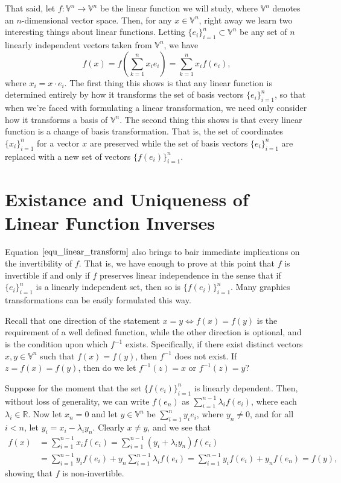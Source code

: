\documentclass[12pt]{article}
\newcommand{\V}{\mathbb{V}}
\newcommand{\R}{\mathbb{R}}
\begin{document}
That said, let $f:\V^n\to\V^n$ be the linear function we will study, where $\V^n$
denotes an $n$-dimensional vector space.  Then, for any $x\in\V^n$, right
away we learn two interesting things about linear functions.  Letting $\{e_i\}_{i=1}^n\subset\V^n$
be any set of $n$ linearly independent vectors taken from $\V^n$, we have
\begin{equation}\label{equ_linear_transform}
f(x) = f\left(\sum_{k=1}^n x_i e_i\right) = \sum_{k=1}^n x_i f(e_i),
\end{equation}
where $x_i = x\cdot e_i$.  The first thing this shows is that any linear function
is determined entirely by how it transforms the set of basis vectors $\{e_i\}_{i=1}^n$,
so that when we're faced with formulating a linear transformation, we need only
consider how it transforms a basis of $\V^n$.  The second thing this shows is
that every linear function is a change of basis transformation.  That is, the
set of coordinates $\{x_i\}_{i=1}^n$ for a vector $x$ are preserved while
the set of basis vectors $\{e_i\}_{i=1}^n$ are replaced with a new set
of vectors $\{f(e_i)\}_{i=1}^n$.

\section{Existance and Uniqueness of Linear Function Inverses}

Equation $\eqref{equ_linear_transform}$ also brings to bair immediate
implications on the invertibility of $f$.  That is, we have enough to
prove at this point that $f$ is invertible if and only if $f$ preserves
linear independence in the sense that if $\{e_i\}_{i=1}^n$ is a
linearly independent set, then so is $\{f(e_i)\}_{i=1}^n$.  Many graphics
transformations can be easily formulated this way.

Recall that one direction of the statement $x=y\iff f(x)=f(y)$ is the
requirement of a well defined function, while the other direction is optional,
and is the condition upon which $f^{-1}$ exists.  Specifically, if there
exist distinct vectors $x,y\in\V^n$ such that $f(x)=f(y)$, then
$f^{-1}$ does not exist.  If $z=f(x)=f(y)$, then do we let $f^{-1}(z)=x$
or $f^{-1}(z)=y$?

Suppose for the moment that the set $\{f(e_i)\}_{i=1}^n$ is linearly dependent.
Then, without loss of generality, we can write $f(e_n)$
as $\sum_{i=1}^{n-1}\lambda_i f(e_i)$, where each $\lambda_i\in\R$.
Now let $x_n=0$ and let $y\in\V^n$ be $\sum_{i=1}^n y_i e_i$, where $y_n\neq 0$,
and for all $i<n$, let $y_i=x_i-\lambda_i y_n$.  Clearly $x\neq y$, and we see that
\begin{align*}
f(x) &= \sum_{i=1}^{n-1} x_if(e_i)
 = \sum_{i=1}^{n-1}(y_i+\lambda_i y_n)f(e_i) \\
 &= \sum_{i=1}^{n-1}y_i f(e_i) + y_n\sum_{i=1}^{n-1}\lambda_i f(e_i)
 = \sum_{i=1}^{n-1}y_i f(e_i) + y_n f(e_n)
 = f(y),
\end{align*}
showing that $f$ is non-invertible.
\end{document}
